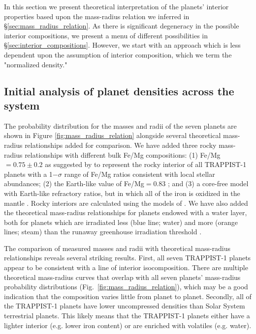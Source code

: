 \documentclass[fleqn,usenatbib]{mnras} %
\begin{document}
In this section we present theoretical interpretation of the planets'
interior properties based upon the mass-radius relation we inferred in \S \ref{sec:mass_radius_relation}.  As there is significant degeneracy in the possible interior compositions, we present a menu of different possibilities in \S \ref{sec:interior_compositions}.  However, we start with an approach which is less dependent upon the assumption of interior composition, which we term the "normalized density."

\subsection{Initial analysis of planet densities across the system}

The probability distribution for the masses and radii of the seven planets are shown in Figure \ref{fig:mass_radius_relation} alongside several theoretical mass-radius relationships added for comparison. 
We have added three rocky mass-radius relationships with different bulk Fe/Mg compositions:  (1) Fe/Mg$ =0.75{\pm} 0.2$ as suggested by \citet{Unterborn2018a} to represent the rocky interior of all TRAPPIST-1 planets with a 1$-\sigma$ range of Fe/Mg ratios consistent with local stellar abundances;  (2) the Earth-like value of Fe/Mg$ = 0.83$ \citep{Lodders2009}; and (3) a core-free model with Earth-like refractory ratios, but in which all of the iron is oxidized in the mantle \citep{ElkinsTanton2008}. Rocky interiors are calculated using the models of \citet{Dorn2016}. We have also added the theoretical mass-radius relationships for planets endowed with a water layer, both for planets which are irradiated less (blue line; water) and more (orange lines; steam) than the runaway greenhouse irradiation threshold \citep{Turbet2020}.

The comparison of measured masses and radii with theoretical mass-radius relationships reveals several striking results. First, all seven TRAPPIST-1 planets appear to be consistent with a line of interior isocomposition. There are multiple theoretical mass-radius curves that overlap with all seven planets' mass-radius probability distributions (Fig.\ \ref{fig:mass_radius_relation}), which may be a good indication that the composition varies little from planet to planet. Secondly, all of the TRAPPIST-1 planets have lower uncompressed densities than Solar System terrestrial planets. This likely means that the TRAPPIST-1 planets either have a lighter interior (e.g. lower iron content) or are enriched with volatiles (e.g. water).
\end{document}
